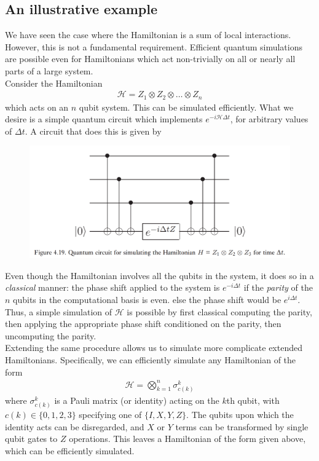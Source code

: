 \documentclass{book}
\theoremstyle{definition}
\newcommand{\had}{\mathcal{H}}
\begin{document}
\subsection{An illustrative example}

We have seen the case where the Hamiltonian is a sum of local interactions. However, this is not a fundamental requirement. Efficient quantum simulations are possible even for Hamiltonians which act non-trivially on all or nearly all parts of a large system. \\

Consider the Hamiltonian
\begin{align}
\had = Z_1 \otimes Z_2 \otimes \dots \otimes Z_n
\end{align}
which acts on an $n$ qubit system. This can be simulated efficiently. What we desire is a simple quantum circuit which implements $e^{-i \had \Delta t}$, for arbitrary values of $\Delta t$. A circuit that does this is given by
\begin{figure}[!htb]
	\centering
	\includegraphics[scale=0.25]{qs1}
\end{figure}

Even though the Hamiltonian involves all the qubits in the system, it does so in a \textit{classical} manner: the phase shift applied to the system is $e^{-i\Delta t}$ if the \textit{parity} of the $n$ qubits in the computational basis is even. else the phase shift would be $e^{i\Delta t}$. Thus, a simple simulation of $\had$ is possible by first classical computing the parity, then applying the appropriate phase shift conditioned on the parity, then uncomputing the parity. \\

Extending the same procedure allows us to simulate more complicate extended Hamiltonians. Specifically, we can efficiently simulate any Hamiltonian of the form
\begin{align}
\had = \bigotimes^n_{k=1}\sigma^k_{c(k)}
\end{align}
where $\sigma^k_{c(k)}$ is a Pauli matrix (or identity) acting on the $k$th qubit, with $c(k) \in \{0,1,2,3\}$ specifying one of $\{I,X,Y,Z\}$. The qubits upon which the identity acts can be disregarded, and $X$ or $Y$ terms can be transformed by single qubit gates to $Z$ operations. This leaves a Hamiltonian of the form given above, which can be efficiently simulated. \\
\end{document}
